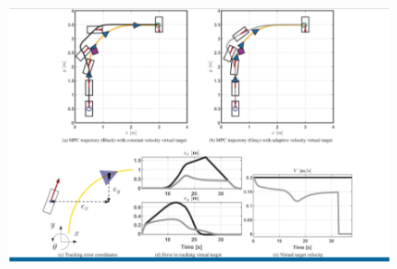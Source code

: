 \documentclass[sigplan,screen]{acmart}
\begin{document}
\begin{itemize}
\begin{figure}[h]
    \centering
    \includegraphics[width=\linewidth]{9.png}
\end{figure}
\end{itemize}





\end{document}
